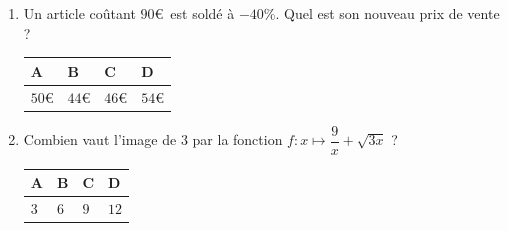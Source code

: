 \documentclass[oneside,12pt]{exam}          %
\begin{document}
\begin{enumerate}[label=\underline{Question \no\arabic*} :  , leftmargin=* , itemsep=5mm]
		

	\item Un article coûtant $90$\euro\, est soldé à $-40\%$. Quel est son nouveau prix de vente ?
	
		\hspace{\linewidth-\textwidth}
		\renewcommand{\arraystretch}{1.5}
		\begin{tabular}{| P{0.22\textwidth} | P{0.22\textwidth} | P{0.22\textwidth} | P{0.22\textwidth} |} \hline
			A & B & C & D \\ \hline
			$50$\euro & $44$\euro & $46$\euro & $54$\euro \\ \hline
		\end{tabular}
		
		
		

	\item Combien vaut l'image de $3$ par la fonction $f : x \mapsto \dfrac{9}{x} + \sqrt{3x}$ \; ?
	
		\hspace{\linewidth-\textwidth}
		\renewcommand{\arraystretch}{1.5}
		\begin{tabular}{| P{0.22\textwidth} | P{0.22\textwidth} | P{0.22\textwidth} | P{0.22\textwidth} |} \hline
			A & B & C & D \\ \hline
			$3$ & $6$ & $9$ & $12$ \\ \hline
		\end{tabular}	
		
\end{enumerate}
\end{document}
